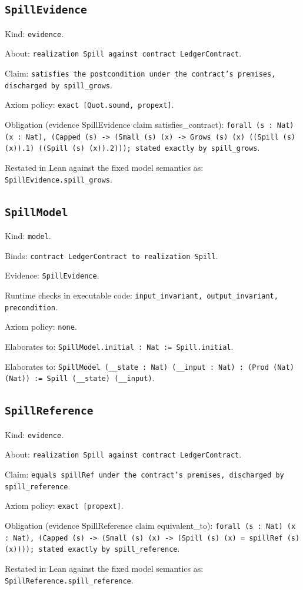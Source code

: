 \documentclass[11pt]{article}
\begin{document}
\subsection*{\texttt{SpillEvidence}}
\noindent Kind: \texttt{evidence}.\par
\noindent About: \texttt{realization Spill against contract LedgerContract}.\par
\noindent Claim: \texttt{satisfies the postcondition under the contract's premises, discharged by spill\_grows}.\par
\noindent Axiom policy: \texttt{exact [Quot.sound, propext]}.\par
\noindent Obligation (evidence SpillEvidence claim satisfies\_contract): \texttt{forall (s : Nat) (x : Nat), (Capped (s) -> (Small (s) (x) -> Grows (s) (x) ((Spill (s) (x)).1) ((Spill (s) (x)).2))); stated exactly by spill\_grows}.\par
\noindent Restated in Lean against the fixed model semantics as: \texttt{SpillEvidence.spill\_grows}.\par
\subsection*{\texttt{SpillModel}}
\noindent Kind: \texttt{model}.\par
\noindent Binds: \texttt{contract LedgerContract to realization Spill}.\par
\noindent Evidence: \texttt{SpillEvidence}.\par
\noindent Runtime checks in executable code: \texttt{input\_invariant, output\_invariant, precondition}.\par
\noindent Axiom policy: \texttt{none}.\par
\noindent Elaborates to: \texttt{SpillModel.initial : Nat := Spill.initial}.\par
\noindent Elaborates to: \texttt{SpillModel (\_\_state : Nat) (\_\_input : Nat) : (Prod (Nat) (Nat)) := Spill (\_\_state) (\_\_input)}.\par
\subsection*{\texttt{SpillReference}}
\noindent Kind: \texttt{evidence}.\par
\noindent About: \texttt{realization Spill against contract LedgerContract}.\par
\noindent Claim: \texttt{equals spillRef under the contract's premises, discharged by spill\_reference}.\par
\noindent Axiom policy: \texttt{exact [propext]}.\par
\noindent Obligation (evidence SpillReference claim equivalent\_to): \texttt{forall (s : Nat) (x : Nat), (Capped (s) -> (Small (s) (x) -> (Spill (s) (x) = spillRef (s) (x)))); stated exactly by spill\_reference}.\par
\noindent Restated in Lean against the fixed model semantics as: \texttt{SpillReference.spill\_reference}.\par
\end{document}
